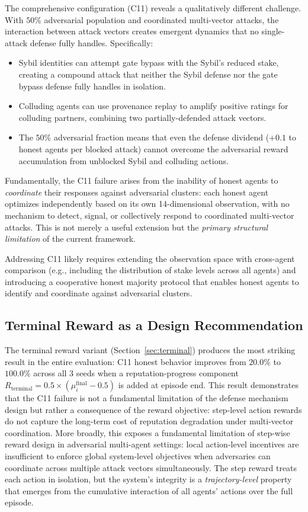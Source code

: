 The comprehensive configuration (C11) reveals a qualitatively different
challenge.  With $50\%$ adversarial population and coordinated multi-vector
attacks, the interaction between attack vectors creates emergent dynamics
that no single-attack defense fully handles.  Specifically:
\begin{itemize}[noitemsep]
  \item Sybil identities can attempt gate bypass with the Sybil's reduced
        stake, creating a compound attack that neither the Sybil defense
        nor the gate bypass defense fully handles in isolation.
  \item Colluding agents can use provenance replay to amplify positive
        ratings for colluding partners, combining two partially-defended
        attack vectors.
  \item The $50\%$ adversarial fraction means that even the defense dividend
        ($+0.1$ to honest agents per blocked attack) cannot overcome the
        adversarial reward accumulation from unblocked Sybil and colluding
        actions.
\end{itemize}
Fundamentally, the C11 failure arises from the inability of honest agents
to \emph{coordinate} their responses against adversarial clusters: each
honest agent optimizes independently based on its own 14-dimensional
observation, with no mechanism to detect, signal, or collectively respond
to coordinated multi-vector attacks.  This is not merely a useful
extension but the \emph{primary structural limitation} of the current
framework.

Addressing C11 likely requires extending the observation space with
cross-agent comparison (e.g., including the distribution of stake levels
across all agents) and introducing a cooperative honest majority protocol
that enables honest agents to identify and coordinate against adversarial
clusters.

\subsection{Terminal Reward as a Design Recommendation}
\label{sec:terminal_design}

The terminal reward variant (Section~\ref{sec:terminal}) produces the most
striking result in the entire evaluation: C11 honest behavior improves from
$20.0\%$ to $100.0\%$ across all 3 seeds when a reputation-progress component
$R_{\text{terminal}} = 0.5 \times (\mu_i^{\text{final}} - 0.5)$ is added at
episode end.  This result demonstrates that the C11 failure is not a
fundamental limitation of the defense mechanism design but rather a consequence
of the reward objective: step-level action rewards do not capture the long-term
cost of reputation degradation under multi-vector coordination.
More broadly, this exposes a fundamental limitation of step-wise reward
design in adversarial multi-agent settings: local action-level incentives
are insufficient to enforce global system-level objectives when adversaries
can coordinate across multiple attack vectors simultaneously.  The step
reward treats each action in isolation, but the system's integrity is a
\emph{trajectory-level} property that emerges from the cumulative
interaction of all agents' actions over the full episode.

